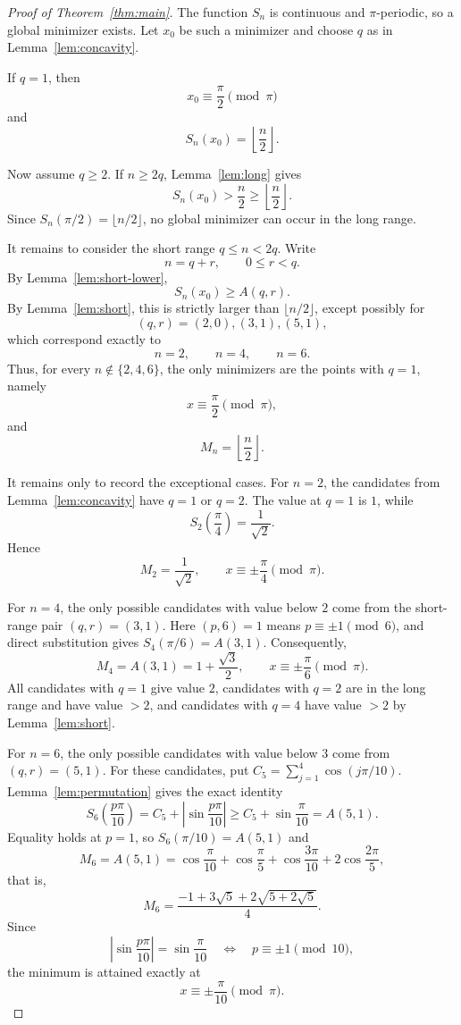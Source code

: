 \documentclass[11pt]{article}
\begin{document}
\begin{proof}[Proof of Theorem~\ref{thm:main}]
The function \(S_n\) is continuous and \(\pi\)-periodic, so a global
minimizer exists. Let \(x_0\) be such a minimizer and choose \(q\) as
in Lemma~\ref{lem:concavity}.

If \(q=1\), then
\[
        x_0\equiv \frac{\pi}{2}\pmod{\pi}
\]
and
\[
        S_n(x_0)=\left\lfloor\frac n2\right\rfloor.
\]

Now assume \(q\ge2\). If \(n\ge2q\), Lemma~\ref{lem:long} gives
\[
        S_n(x_0)>\frac n2\ge \left\lfloor\frac n2\right\rfloor.
\]
Since \(S_n(\pi/2)=\lfloor n/2\rfloor\), no global minimizer can
occur in the long range.

It remains to consider the short range \(q\le n<2q\). Write
\[
        n=q+r,\qquad 0\le r<q.
\]
By Lemma~\ref{lem:short-lower},
\[
        S_n(x_0)\ge A(q,r).
\]
By Lemma~\ref{lem:short}, this is strictly larger than \(\lfloor n/2\rfloor\), except possibly for
\[
        (q,r)=(2,0),(3,1),(5,1),
\]
which correspond exactly to
\[
        n=2,\qquad n=4,\qquad n=6.
\]
Thus, for every \(n\notin\{2,4,6\}\), the only minimizers are the points with \(q=1\), namely
\[
        x\equiv\frac{\pi}{2}\pmod{\pi},
\]
and
\[
        M_n=\left\lfloor\frac n2\right\rfloor.
\]

It remains only to record the exceptional cases. For \(n=2\), the candidates from Lemma~\ref{lem:concavity} have \(q=1\) or \(q=2\). The value at \(q=1\) is \(1\), while
\[
        S_2\!\left(\frac{\pi}{4}\right)
        =
        \frac1{\sqrt2}.
\]
Hence
\[
        M_2=\frac1{\sqrt2},
        \qquad
        x\equiv\pm\frac{\pi}{4}\pmod{\pi}.
\]

For \(n=4\), the only possible candidates with value below \(2\)
come from the short-range pair \((q,r)=(3,1)\). Here
\((p,6)=1\) means \(p\equiv\pm1\pmod6\), and direct substitution
gives \(S_4(\pi/6)=A(3,1)\). Consequently,
\[
        M_4=A(3,1)=1+\frac{\sqrt3}{2},
        \qquad
        x\equiv\pm\frac{\pi}{6}\pmod{\pi}.
\]
All candidates with \(q=1\) give value \(2\), candidates with \(q=2\) are in the long range and have value \(>2\), and candidates with \(q=4\) have value \(>2\) by Lemma~\ref{lem:short}.

For \(n=6\), the only possible candidates with value below \(3\)
come from \((q,r)=(5,1)\). For these candidates,
put \(C_5=\sum_{j=1}^4\cos(j\pi/10)\).
Lemma~\ref{lem:permutation} gives the exact identity
\[
        S_6\!\left(\frac{p\pi}{10}\right)
        =C_5+\left|\sin\frac{p\pi}{10}\right|
        \ge C_5+\sin\frac\pi{10}=A(5,1).
\]
Equality holds at \(p=1\), so \(S_6(\pi/10)=A(5,1)\) and
\[
        M_6=A(5,1)
        =
        \cos\frac{\pi}{10}
        +\cos\frac{\pi}{5}
        +\cos\frac{3\pi}{10}
        +2\cos\frac{2\pi}{5},
\]
that is,
\[
        M_6=
        \frac{-1+3\sqrt5+2\sqrt{5+2\sqrt5}}4.
\]
Since
\[
        \left|\sin\frac{p\pi}{10}\right|=\sin\frac\pi{10}
        \quad\Longleftrightarrow\quad
        p\equiv\pm1\pmod{10},
\]
the minimum is attained exactly at
\[
        x\equiv\pm\frac{\pi}{10}\pmod{\pi}.
\]
\end{proof}
\end{document}
